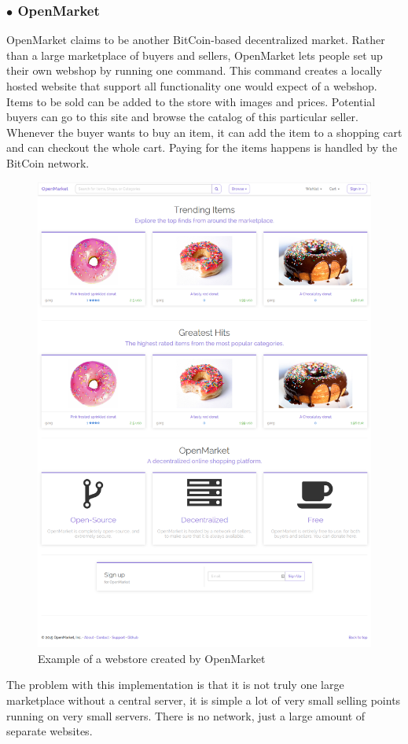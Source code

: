 \subsubsection*{$\bullet$ OpenMarket}
OpenMarket \cite{openmarket} claims to be another BitCoin-based decentralized market.
Rather than a large marketplace of buyers and sellers, OpenMarket lets people set up their own webshop by running one command.
This command creates a locally hosted website that support all functionality one would expect of a webshop.
Items to be sold can be added to the store with images and prices. 
Potential buyers can go to this site and browse the catalog of this particular seller.
Whenever the buyer wants to buy an item, it can add the item to a shopping cart and can checkout the whole cart.
Paying for the items happens is handled by the BitCoin network.
\begin{figure}[H]
  \centering
  \includegraphics[scale=0.2]{openmarket}
  \caption{Example of a webstore created by OpenMarket}
  \label{openmarketfig}
\end{figure}
The problem with this implementation is that it is not truly one large marketplace without a central server, it is simple a lot of very small selling points running on very small servers.
There is no network, just a large amount of separate websites.
